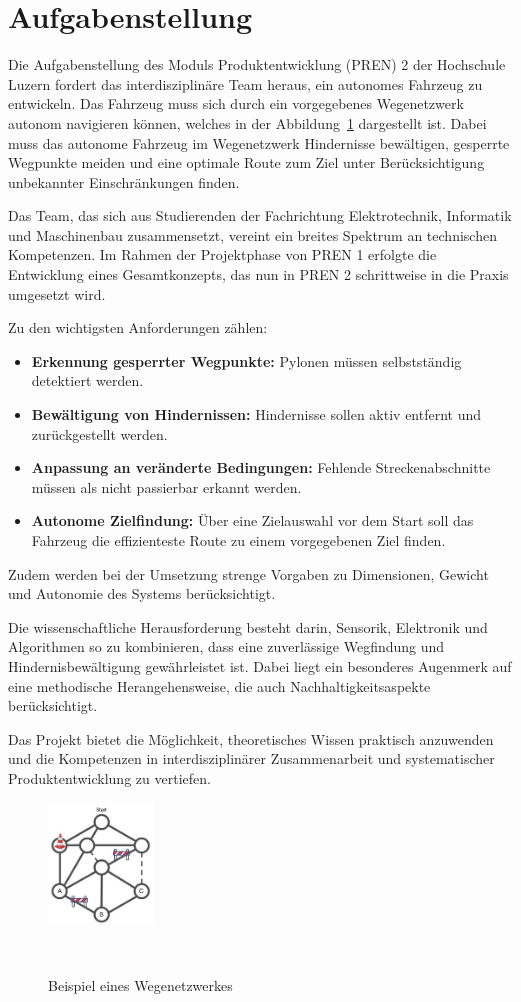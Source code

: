 \documentclass[main.tex]{subfiles} %
\begin{document}

\section{Aufgabenstellung}

Die Aufgabenstellung des Moduls Produktentwicklung (PREN) 2 der
Hochschule Luzern fordert das interdisziplinäre Team heraus, ein autonomes 
Fahrzeug zu entwickeln. Das Fahrzeug muss sich durch ein vorgegebenes Wegenetzwerk autonom navigieren können, welches in der Abbildung~\ref{fig:Wegenetzwerk_Aufgabenstellung} dargestellt ist.
Dabei muss das autonome Fahrzeug im Wegenetzwerk Hindernisse bewältigen, gesperrte Wegpunkte meiden und eine optimale 
Route zum Ziel unter Berücksichtigung unbekannter Einschränkungen finden.

Das Team, das sich aus Studierenden der Fachrichtung Elektrotechnik, Informatik und Maschinenbau 
zusammensetzt, vereint ein breites Spektrum an technischen Kompetenzen. Im Rahmen der Projektphase von PREN 1 
erfolgte die Entwicklung eines Gesamtkonzepts, das nun in PREN 2 schrittweise in die Praxis umgesetzt wird.

Zu den wichtigsten Anforderungen zählen:
\begin{itemize}
    \item \textbf{Erkennung gesperrter Wegpunkte:} Pylonen müssen selbstständig detektiert werden.
    \item \textbf{Bewältigung von Hindernissen:} Hindernisse sollen aktiv entfernt und zurückgestellt werden.
    \item \textbf{Anpassung an veränderte Bedingungen:} Fehlende Streckenabschnitte müssen als nicht passierbar erkannt werden.
    \item \textbf{Autonome Zielfindung:} Über eine Zielauswahl vor dem Start soll das Fahrzeug die effizienteste Route zu einem vorgegebenen Ziel finden.
\end{itemize}

Zudem werden bei der Umsetzung strenge Vorgaben zu Dimensionen, Gewicht und
Autonomie des Systems berücksichtigt.

Die wissenschaftliche Herausforderung besteht darin, Sensorik, Elektronik 
und Algorithmen so zu kombinieren, dass eine zuverlässige Wegfindung und 
Hindernisbewältigung gewährleistet ist. Dabei liegt ein besonderes Augenmerk auf 
eine methodische Herangehensweise, die auch Nachhaltigkeitsaspekte berücksichtigt.

Das Projekt bietet die Möglichkeit, theoretisches Wissen praktisch 
anzuwenden und die Kompetenzen in interdisziplinärer Zusammenarbeit 
und systematischer Produktentwicklung zu vertiefen.

\begin{figure}[H]
    \centering
    \includegraphics[width=0.25\textwidth]{Wegenetzwerk_Aufgabenstellung.pdf}
    \caption{Beispiel eines Wegenetzwerkes}~\label{fig:Wegenetzwerk_Aufgabenstellung}
\end{figure}
\end{document}
